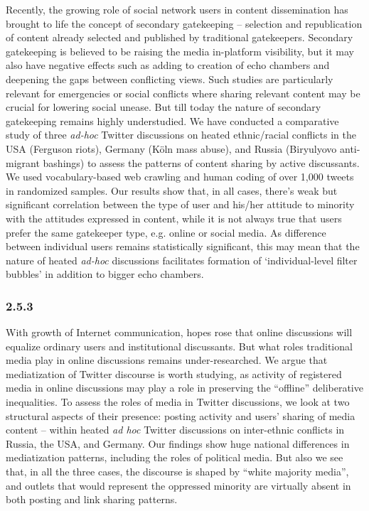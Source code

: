 Recently, the growing role of social network users in content dissemination has brought to life the concept of secondary gatekeeping -- selection and republication of content already selected and published by traditional gatekeepers. Secondary gatekeeping is believed to be raising the media in-platform visibility, but it may also have negative effects such as adding to creation of echo chambers and deepening the gaps between conflicting views. Such studies are particularly relevant for emergencies or social conflicts where sharing relevant content may be crucial for lowering social unease. But till today the nature of secondary gatekeeping remains highly understudied. We have conducted a comparative study of three \textit{ad-hoc} Twitter discussions on heated ethnic/racial conflicts in the USA (Ferguson riots), Germany (Köln mass abuse), and Russia (Biryulyovo anti-migrant bashings) to assess the patterns of content sharing by active discussants. We used vocabulary-based web crawling and human coding of over 1,000 tweets in randomized samples. Our results show that, in all cases, there’s weak but significant correlation between the type of user and his/her attitude to minority with the attitudes expressed in content, while it is not always true that users prefer the same gatekeeper type, e.g. online or social media. As difference between individual users remains statistically significant, this may mean that the nature of heated \textit{ad-hoc} discussions facilitates formation of ‘individual-level filter bubbles’ in addition to bigger echo chambers.

\subsubsection{2.5.3}

With growth of Internet communication, hopes rose that online discussions will equalize ordinary users and institutional discussants. But what roles traditional media play in online discussions remains under-researched. We argue that mediatization of Twitter discourse is worth studying, as activity of registered media in online discussions may play a role in preserving the “offline” deliberative inequalities. To assess the roles of media in Twitter discussions, we look at two structural aspects of their presence: posting activity and users’ sharing of media content -- within heated \textit{ad hoc} Twitter discussions on inter-ethnic conflicts in Russia, the USA, and Germany. Our findings show huge national differences in mediatization patterns, including the roles of political media. But also we see that, in all the three cases, the discourse is shaped by “white majority media”, and outlets that would represent the oppressed minority are virtually absent in both posting and link sharing patterns.

